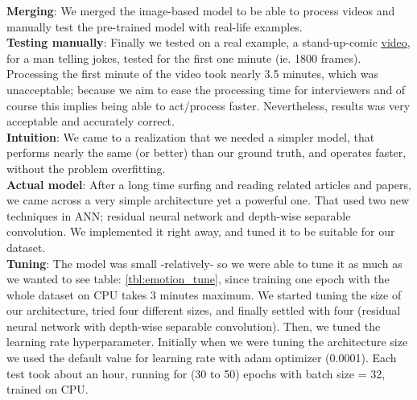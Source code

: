 \textbf{Merging}: We merged the image-based model to be able to process videos and manually test the pre-trained model with real-life examples. \\

\textbf{Testing manually}: Finally we tested on a real example, a stand-up-comic \href{https://drive.google.com/file/d/1EWS8MHNyOIC2-ZVFIYlGsj9iM1l3pnp5/view?usp=sharing}{\underline{video}}, for a man telling jokes, tested for the first one minute (ie. 1800 frames). Processing the first minute of the video took nearly 3.5 minutes, which was unacceptable; because we aim to ease the processing time for interviewers and of course this implies being able to act/process faster. Nevertheless, results was very acceptable and accurately correct.\\

\textbf{Intuition}: We came to a realization that we needed a simpler model, that performs nearly the same (or better) than our ground truth, and operates faster, without the problem overfitting.\\

\textbf{Actual model}: After a long time surfing and reading related articles and papers, we came across a very simple architecture \cite{ariaga} yet a powerful one. That used two new techniques in ANN; residual neural network and depth-wise separable convolution. We implemented it right away, and tuned it to be suitable for our dataset.\\

\textbf{Tuning}: The model was small -relatively- so we were able to tune it as much as we wanted to see table: \ref{tbl:emotion_tune}, since training one epoch with the whole dataset on CPU takes $3$ minutes maximum. We started tuning the size of our architecture, tried four different sizes, and finally settled with four (residual neural network with depth-wise separable convolution). Then, we tuned the learning rate hyperparameter. Initially when we were tuning the architecture size we used the default value for learning rate with adam optimizer (0.0001). Each test took about an hour, running for (30 to 50) epochs with batch size = 32, trained on CPU.\\


